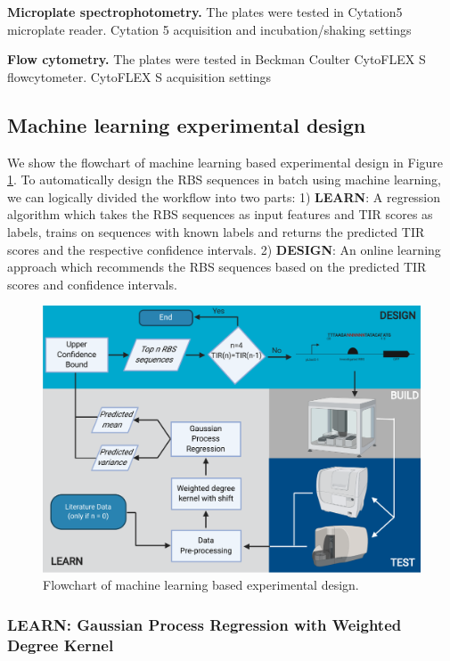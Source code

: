 \textbf{Microplate spectrophotometry.}
The plates were tested in Cytation5 microplate reader.
Cytation 5 acquisition and incubation/shaking settings

\textbf{Flow cytometry.}
The plates were tested in Beckman Coulter CytoFLEX S flowcytometer.
CytoFLEX S acquisition settings

\subsection{Machine learning experimental design}

We show the flowchart of machine learning based experimental design in Figure \ref{fig: flowchart of machine learning based experimental design.}. 
To automatically design the RBS sequences in batch using machine learning, we can logically divided the workflow into two parts: 
1) \textbf{LEARN}: A regression algorithm which takes the RBS sequences as input features and TIR scores as labels, trains on sequences with known labels and returns the predicted TIR scores and the respective confidence intervals. 
2) \textbf{DESIGN}: An online learning approach which recommends the RBS sequences based on the predicted TIR scores and confidence intervals. 


\begin{figure}[h]
    \centering
    \includegraphics[scale=0.7]{plots/flowchart.pdf}
    \caption{Flowchart of machine learning based experimental design.}
    \label{fig: flowchart of machine learning based experimental design.}
\end{figure}

\subsubsection{LEARN: Gaussian Process Regression with Weighted Degree Kernel}

